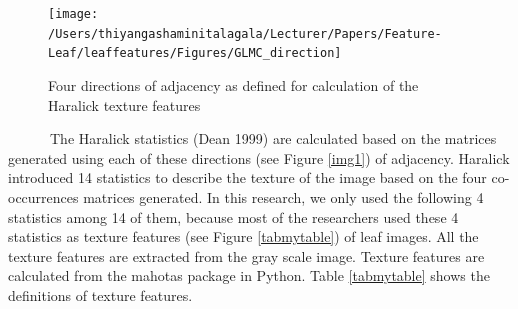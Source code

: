 \documentclass{article}
\begin{document}
\begin{figure}[!ht]

{\centering \texttt{[image: /Users/thiyangashaminitalagala/Lecturer/Papers/Feature-Leaf/leaffeatures/Figures/GLMC\_direction]} 

}

\caption{\label{direction}Four directions of adjacency as defined for calculation of the Haralick texture features}\label{fig:unnamed-chunk-9}
\end{figure}

~~~~~~The Haralick statistics (Dean 1999) are calculated based on the
matrices generated using each of these directions (see Figure
\ref{img1}) of adjacency. Haralick introduced 14 statistics to describe
the texture of the image based on the four co-occurrences matrices
generated. In this research, we only used the following 4 statistics
among 14 of them, because most of the researchers used these 4
statistics as texture features (see Figure \ref{tabmytable}) of leaf
images. All the texture features are extracted from the gray scale
image. Texture features are calculated from the mahotas package in
Python. Table \ref{tabmytable} shows the definitions of texture
features.
\end{document}
